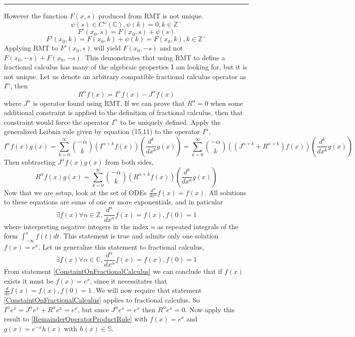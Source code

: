 \documentclass[%
 preprint,
 amsmath, amssymb, aps, pra, 10pt
]{revtex4-2}
\begin{document}
\noindent\rule{\textwidth}{1pt}
However the function $F(x, s)$ produced from RMT is not unique.
\[\psi(s) \in C^{\omega}(\mathbb{C}), \psi(k) = 0, k \in \mathbb{Z}^-\]
\[F'(x_0, s) = F(x_0, s) + \psi(s)\]
\[F'(x_0, k) = F(x_0, k) + \psi(k) = F(x_0, k), k \in \mathbb{Z}^-\]
Applying RMT to $F'(x_0, s)$ will yield $F(x_0, -s)$ and not $F(x_0, -s) + F(x_0, -s)$. This demonstrates that using RMT to define a fractional calculus has many of the algebraic properties I am looking for, but it is not unique. Let us denote an arbitrary compatible fractional calculus operator as $I^\alpha$, then
\[R^\alpha f(x) = I^\alpha f(x) - J^\alpha f(x)\]
where $J^\alpha$ is operator found using RMT. If we can prove that $R^\alpha = 0$ when some additional constraint is applied to the definition of fractional calculus, then that constraint would force the operator $I^\alpha$ to be uniquely defined. Apply the generalized Leibniz rule given by \cite{Leibniz} equation (15.11) to the operator $I^\alpha$,
\[I^\alpha f(x)g(x) = \sum_{k=0}^\infty \binom{-\alpha}{k}\left( I^{\alpha + k}f(x) \right)\left( \frac{d^k}{dx^k} g(x)\right) = \sum_{k=0}^\infty \binom{-\alpha}{k}\left( \left(J^{\alpha + k} + R^{\alpha + k}\right)f(x) \right)\left( \frac{d^k}{dx^k} g(x)\right)\]
Then subtracting $J^\alpha f(x)g(x)$ from both sides, 
\begin{equation}
R^\alpha f(x)g(x) = \sum_{k=0}^\infty \binom{-\alpha}{k}\left( R^{\alpha + k}f(x) \right)\left( \frac{d^k}{dx^k} g(x)\right)
\label{RemainderOperatorProductRule}
\end{equation}
Now that we are setup, look at the set of ODEs $\frac{d^n}{dx^n}f(x) = f(x)$. All solutions to these equations are sums of one or more exponentials, and in paticular
\begin{equation}
\exists f(x) \forall n \in \mathbb{Z}, \frac{d^n}{dx^n}f(x) = f(x), f(0) = 1
\label{ConstaintOnCalculus}
\end{equation}
where interpreting negative integers in the index $n$ as repeated integrals of the form $\int_{-\infty}^x f(t)dt$. This statement is true and admits only one solution $f(x) = e^x$. Let us generalize this statement to fractional calculus,
\begin{equation}
\exists f(x) \forall \alpha \in \mathbb{C}, \frac{d^\alpha}{dx^\alpha}f(x) = f(x), f(0) = 1
\label{ConstaintOnFractionalCalculus}
\end{equation}
From statement \eqref{ConstaintOnFractionalCalculus} we can conclude that if $f(x)$ exists it must be $f(x) = e^x$, since it necessitates that $\frac{d}{dx}f(x) = f(x), f(0) = 1$. We will now require that statement \eqref{ConstaintOnFractionalCalculus} applies to fractional calculus. So $I^\alpha e^x = J^\alpha e^x + R^\alpha e^x = e^x$, but since $J^\alpha e^x = e^x$ then $R^\alpha e^x = 0$. Now apply this result to \eqref{RemainderOperatorProductRule} with $f(x) = e^x$ and $g(x) = e^{-x}h(x)$ with $h(x) \in \mathbb{S}$.
\end{document}
